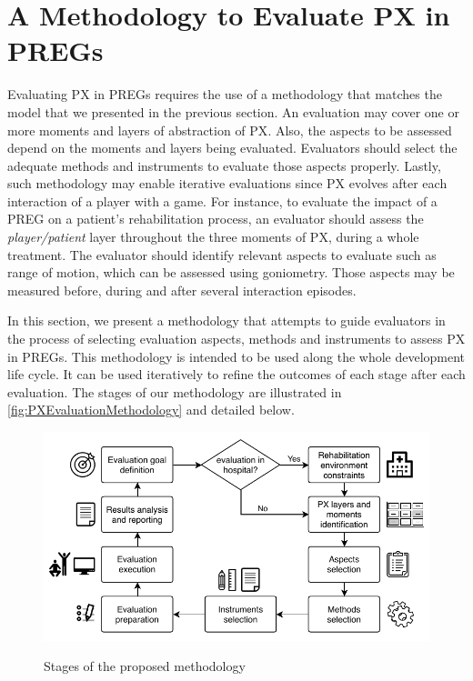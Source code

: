 \section{A Methodology to Evaluate PX in PREGs}
\label{sec:methodology}
Evaluating \ac{PX} in \acp{PREG} requires the use of a methodology that matches the model that we presented in the previous section. An evaluation may cover one or more moments and layers of abstraction of \ac{PX}. Also, the aspects to be assessed depend on the moments and layers being evaluated. Evaluators should select the adequate methods and instruments to evaluate those aspects properly. Lastly, such methodology may enable iterative evaluations since \ac{PX} evolves after each interaction of a player with a game. For instance, to evaluate the impact of a \ac{PREG} on a patient's rehabilitation process, an evaluator should assess the \textit{player/patient} layer throughout the three moments of \ac{PX}, during a whole treatment. The evaluator should identify relevant aspects to evaluate such as range of motion, which can be assessed using goniometry. Those aspects may be measured before, during and after several interaction episodes.

In this section, we present a methodology that attempts to guide evaluators in the process of selecting evaluation aspects, methods and instruments to assess \ac{PX} in \acp{PREG}. This methodology is intended to be used along the whole development life cycle. It can be used iteratively to refine the outcomes of each stage after each evaluation. The stages of our methodology are illustrated in \autoref{fig:PXEvaluationMethodology} and detailed below.

\begin{figure}[bth]
\myfloatalign
{\includegraphics[width=\linewidth]{gfx/model/PXEvaluationMethodology}} \quad
\caption{Stages of the proposed methodology}\label{fig:PXEvaluationMethodology}
\end{figure}

